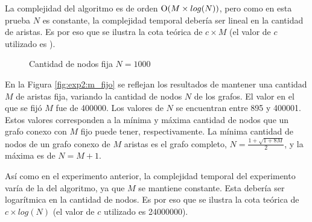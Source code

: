     La complejidad del algoritmo es de orden $\operatorname{O}(M \times log(N))$, pero como en esta prueba $N$ es constante, la complejidad temporal debería ser lineal en la cantidad de aristas. Es por eso que se ilustra la cota teórica de $c \times M$ (el valor de $c$ utilizado es \constante).

    \begin{figure}[H]
        \centering
        \caption{Cantidad de nodos fija $N = 1000$}
        \label{fig:exp2:n_fijo}
    \end{figure}

    \renewcommand\constante{24000000}

    En la Figura \ref{fig:exp2:m_fijo} se reflejan los resultados de mantener una cantidad $M$ de aristas fija, variando la cantidad de nodos $N$ de los grafos. El valor en el que se fijó $M$ fue de 400000. Los valores de $N$ se encuentran entre 895 y 400001. Estos valores corresponden a la mínima y máxima cantidad de nodos que un grafo conexo con $M$ fijo puede tener, respectivamente. La mínima cantidad de nodos de un grafo conexo de $M$ aristas es el grafo completo, $N = \frac{1 + \sqrt{1 + 8M}}{2}$, y la máxima es de $N = M + 1$.

    Así como en el experimento anterior, la complejidad temporal del experimento varía de la del algoritmo, ya que $M$ se mantiene constante. Esta debería ser logarítmica en la cantidad de nodos. Es por eso que se ilustra la cota teórica de $c \times log(N)$ (el valor de $c$ utilizado es \constante).

